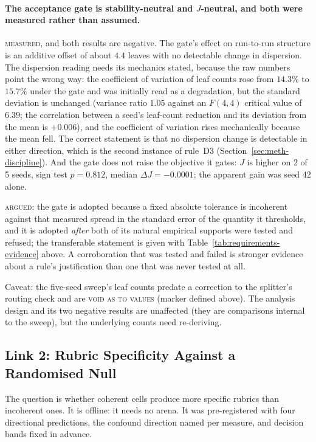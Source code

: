 \paragraph{The acceptance gate is stability-neutral and $J$-neutral,
and both were measured rather than assumed.}
\textsc{measured}, and both results are negative. The gate's effect on
run-to-run structure is an additive offset of about $4.4$ leaves with
no detectable change in dispersion. The dispersion reading needs its
mechanics stated, because the raw numbers point the wrong way: the
coefficient of variation of leaf counts rose from $14.3\%$ to $15.7\%$
under the gate and was initially read as a degradation, but the
standard deviation is unchanged (variance ratio $1.05$ against an
$F(4,4)$ critical value of $6.39$; the correlation between a seed's
leaf-count reduction and its deviation from the mean is $+0.006$), and
the coefficient of variation rises mechanically because the mean fell.
The correct statement is that no dispersion change is detectable in
either direction, which is the second instance of rule~D3
(Section~\ref{sec:meth-discipline}). And the gate does not raise the
objective it gates: $J$ is higher on 2 of 5 seeds, sign test
$p = 0.812$, median $\Delta J = -0.0001$; the apparent gain was seed 42
alone.

\textsc{argued}: the gate is adopted because a fixed absolute
tolerance is incoherent against that measured spread in the standard
error of the quantity it thresholds, and it is adopted \emph{after}
both of its natural empirical supports were tested and refused; the
transferable statement is given with
Table~\ref{tab:requirements-evidence} above. A
corroboration that was tested and failed is stronger evidence about a
rule's justification than one that was never tested at all.

Caveat: the five-seed sweep's leaf counts predate a correction to the
splitter's routing check and are \textsc{void as to values} (marker
defined above). The analysis design and its
two negative results are unaffected (they are comparisons internal
to the sweep), but the underlying counts need re-deriving.

\subsection{Link 2: Rubric Specificity Against a Randomised Null}\label{sec:res-rubric-null}

The question is whether coherent cells produce more specific rubrics
than incoherent ones. It is offline: it needs no arena. It was
pre-registered with four directional predictions, the confound
direction named per measure, and decision bands fixed in advance.

